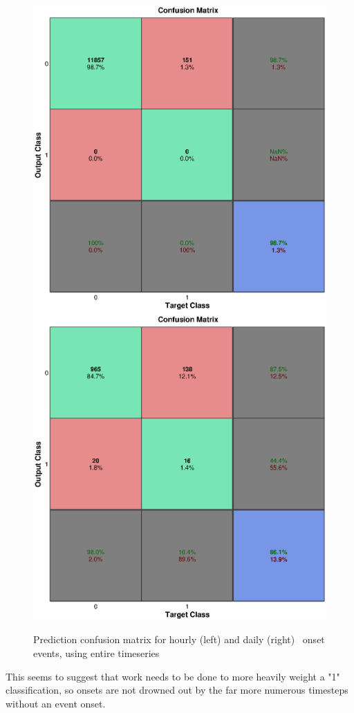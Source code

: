 \begin{figure}[htp!]
	\centering
	\includegraphics[width=0.45\linewidth]{Figures/CH5/NNBinaryOnset-full-hourly-withreq.eps}
	\includegraphics[width=0.45\linewidth]{Figures/CH5/NNBinaryOnset-full-daily-withreq.eps}
	\caption{Prediction confusion matrix for hourly (left) and daily (right) \req\ onset events, using entire timeseries}
	\label{fig:OnsetFullWithreq}
\end{figure}

This seems to suggest that work needs to be done to more heavily weight a "1" classification, so onsets are not drowned out by the far more numerous timesteps without an event onset.